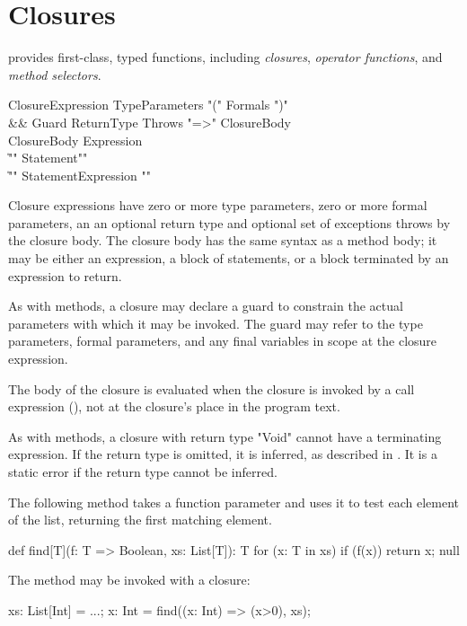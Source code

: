 \section{Closures}
\label{Closures}

\Xten{} provides first-class, typed functions, including
\emph{closures},
\emph{operator functions},
and \emph{method selectors}.

\begin{grammar}
ClosureExpression \:
        TypeParameters\opt
        \xcd"("
        Formals\opt
        \xcd")"
\\ &&
        Guard\opt
        ReturnType\opt
        Throws\opt
        \xcd"=>" ClosureBody \\
ClosureBody \:
        Expression \\
        \| \xcd"{" Statement\star \xcd"}" \\
        \| \xcd"{" Statement\star Expression \xcd"}" \\
\end{grammar}

Closure expressions have zero or more type parameters,
zero or more formal parameters, an an optional return type and
optional set of exceptions throws by the closure body.  The
closure body has the same syntax as a method body; it may be
either an expression, a block of statements, or a block
terminated by an expression to return.

\label{ClosureGuard}

As with methods, a closure may declare a guard to
constrain the actual parameters with which it may be invoked.
The guard may refer to the type parameters, formal parameters,
and any final variables in scope at the closure expression.

The body of the closure is evaluated when the closure is
invoked by a call expression (), not at the closure's
place in the program text.

As with methods, a closure with return type \xcd"Void" cannot
have a terminating expression. 
If the return type is omitted, it is inferred, as described in
.
It is a static error if the return type cannot be inferred.

\begin{example}
The following method takes a function parameter and uses it to
test each element of the list, returning the first matching
element.
\begin{xten}
def find[T](f: T => Boolean, xs: List[T]): T {
  for (x: T in xs)
    if (f(x)) return x;
  null
}
\end{xten}

The method may be invoked with a closure:
\begin{xten}
xs: List[Int] = ...;
x: Int = find((x: Int) => (x>0), xs);
\end{xten}
\end{example}

